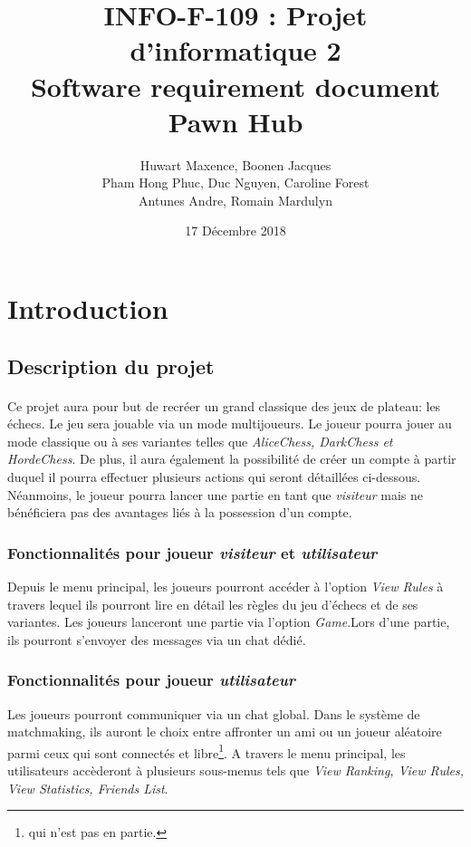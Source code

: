 \documentclass[10pt, a4paper]{article}
\title{\LARGE{INFO-F-109 : Projet d'informatique 2 }\\
       \textbf{Software requirement document\\
	   Pawn Hub}}
\author{Huwart Maxence, Boonen Jacques\\
		Pham Hong Phuc, Duc Nguyen, Caroline Forest\\
		Antunes Andre, Romain Mardulyn}
\date{17 Décembre 2018}
\begin{document}
	\maketitle
	\newpage
	\tableofcontents %
	\newpage
	\section{Introduction}
		\subsection{Description du projet}
			\paragraph{}Ce projet aura pour but de recréer un grand classique des jeux de plateau: les échecs. Le jeu sera jouable via un mode multijoueurs. Le joueur pourra jouer au mode classique ou à ses variantes telles que  {\itshape AliceChess, DarkChess et HordeChess}. De plus, il aura également la possibilité de créer un compte à partir duquel il pourra effectuer plusieurs actions qui seront détaillées ci-dessous. Néanmoins, le joueur pourra lancer une partie en tant que {\itshape visiteur} mais ne bénéficiera pas des avantages liés à la possession d'un compte.
			
			\subsubsection{Fonctionnalités pour joueur {\itshape  visiteur} et {\itshape utilisateur}}Depuis le menu principal, les joueurs pourront accéder à l'option {\itshape View Rules} à travers lequel ils pourront lire en détail les règles du jeu d'échecs et de ses variantes. Les joueurs lanceront une partie via l'option {\itshape Game}.Lors d'une partie, ils pourront s'envoyer des messages via un chat dédié.
			
			\subsubsection{Fonctionnalités pour joueur {\itshape utilisateur}}Les joueurs pourront communiquer via un chat global. Dans le système de matchmaking, ils auront le choix entre affronter un ami ou un joueur aléatoire parmi ceux qui sont connectés et libre\footnote{qui n'est pas en partie.}. A travers le menu principal, les utilisateurs accèderont à plusieurs sous-menus tels que {\itshape View Ranking, View Rules, View Statistics, Friends List}.%
			
\end{document}
